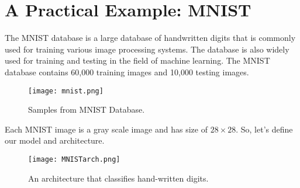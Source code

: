 \documentclass[11pt]{article}
\begin{document}
\section{A Practical Example: MNIST}
\hspace*{1cm}The MNIST database is a large database of handwritten digits that is commonly used for training various image processing systems. The database is also widely used for training and testing in the field of machine learning. The MNIST database contains 60,000 training images and 10,000 testing images.
\begin{figure}[H]
\centering
\texttt{[image: mnist.png]}
\caption{Samples from MNIST Database.}
\label{fig:figure3}
\end{figure}
Each MNIST image is a gray scale image and has size of $28 \times 28$. So, let's define our model and architecture.
\begin{figure}[H]
\centering
\texttt{[image: MNISTarch.png]}
\caption{An architecture that classifies hand-written digits.}
\label{fig:figure3}
\end{figure}
\end{document}
